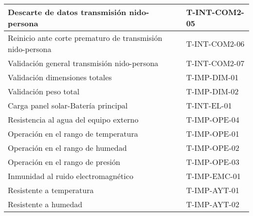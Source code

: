 \begin{table}[H]
\begin{tabular}{|l|l|}
Descarte de datos transmisión nido-persona                                                                           & T-INT-COM2-05                             \\ \hline
Reinicio ante corte prematuro de transmisión nido-persona                                                            & T-INT-COM2-06                             \\ \hline
Validación general transmisión nido-persona                                                                          & T-INT-COM2-07                             \\ \hline
Validación dimensiones totales                                                                                       & T-IMP-DIM-01                              \\ \hline
Validación peso total                                                                                                & T-IMP-DIM-02                              \\ \hline
Carga panel solar-Batería principal                                                                                  & T-INT-EL-01                               \\ \hline
Resistencia al agua del equipo externo                                                                               & T-IMP-OPE-04                              \\ \hline
Operación en el rango de temperatura                                                                                 & T-IMP-OPE-01                              \\ \hline
Operación en el rango de humedad                                                                                     & T-IMP-OPE-02                              \\ \hline
Operación en el rango de presión                                                                                     & T-IMP-OPE-03                              \\ \hline
Inmunidad al ruido electromagnético                                                                                  & T-IMP-EMC-01                              \\ \hline
Resistente a temperatura                                                                                             & T-IMP-AYT-01                              \\ \hline
Resistente a humedad                                                                                                 & T-IMP-AYT-02                              \\ \hline

\end{tabular}
\end{table}
